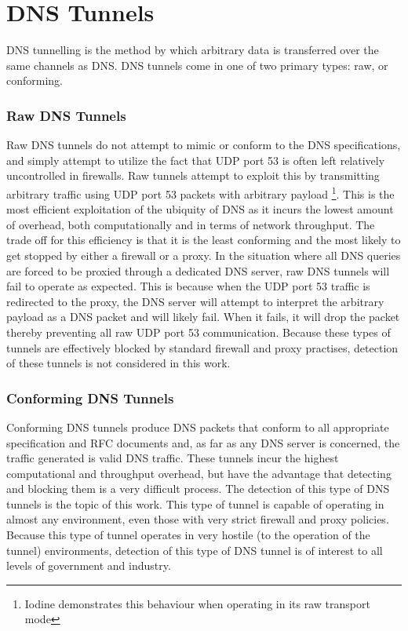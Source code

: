 \documentclass[12pt]{report}
\theoremstyle{remark}
\theoremstyle{definition}
\theoremstyle{definition}
\theoremstyle{definition}
\begin{document}
\section{DNS Tunnels}
\label{tunnels-types}
DNS tunnelling is the method by which arbitrary data is transferred
over the same channels as DNS. DNS tunnels come in one of two primary types: raw, or
conforming.

\subsubsection{Raw DNS Tunnels}
\label{tunnels-types-raw}
Raw DNS tunnels do not attempt to mimic or conform to the DNS specifications,
and simply attempt to utilize the fact that UDP port 53 is often left relatively
uncontrolled in firewalls. Raw tunnels attempt to exploit this by transmitting
arbitrary traffic using UDP port 53 packets with arbitrary payload 
\footnote{Iodine demonstrates this behaviour when operating in its raw
transport mode}. This is the most efficient exploitation of the ubiquity of DNS
as it incurs the lowest amount of overhead, both computationally and in terms of
network throughput. The trade off for this efficiency is that it is the least
conforming and the most likely to get stopped by either a firewall or a proxy.
In the situation where all DNS queries are forced to be proxied through a
dedicated DNS server, raw DNS tunnels will fail to operate as expected. This is
because when the UDP port 53 traffic is redirected to the proxy, the DNS server
will attempt to interpret the arbitrary payload as a DNS packet and will likely
fail. When it fails, it will drop the packet thereby preventing all raw UDP port
53 communication. Because these types of tunnels are effectively blocked by
standard firewall and proxy practises, detection of these tunnels is not
considered in this work.

\subsubsection{Conforming DNS Tunnels}
\label{tunnels-types-conforming}
Conforming DNS tunnels produce DNS packets that conform to all appropriate
specification and RFC documents and, as far as any DNS server is concerned, the
traffic generated is valid DNS traffic. These tunnels incur the highest
computational and throughput overhead, but have the advantage that detecting and
blocking them is a very difficult process. The detection of this type of DNS
tunnels is the topic of this work. This type of tunnel is capable of operating
in almost any environment, even those with very strict firewall and proxy policies. Because
this type of tunnel operates in very hostile (to the operation of the tunnel)
environments, detection of this type of DNS tunnel is of interest to all levels
of government and industry.
\end{document}
